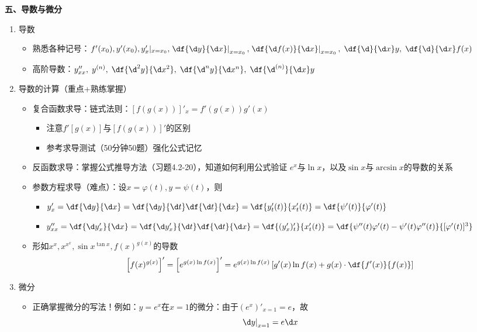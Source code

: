 \bigskip

{\bf 五、导数与微分}
\begin{enumerate}
  \item 导数
  \begin{itemize}
    \item 熟悉各种记号：$f'(x_0), y'(x_0),y'_x|_{x=x_0},
    \left.\df{\d y}{\d x}\right|_{x=x_0},
    \left.\df{\d f(x)}{\d x}\right|_{x=x_0},\;\df{\d}{\d x}y,\;\df{\d}{\d
    x}f(x)$
    \item 高阶导数：$y''_{xx},\;y^{(n)},\;\df{\d^2y}{\d x^2},\;\df{\d^{n}y}{\d
    x^n},\;\df{\d^{(n)}}{\d x}y$
  \end{itemize}
  \item 导数的计算（重点+熟练掌握）
  \begin{itemize}
    \item 复合函数求导：链式法则：$[f(g(x))]'_x=f'(g(x))g'(x)$
    \begin{itemize}
      \item 注意$f'[g(x)]$与$[f(g(x))]'$的区别
      \item 参考求导测试（50分钟50题）强化公式记忆
    \end{itemize}
    \item 反函数求导：掌握公式推导方法（习题4.2-20），知道如何利用公式验证
    $e^x$与$\ln x$，以及$\sin x$与$\arcsin x$的导数的关系
    \item 参数方程求导（难点）：设$x=\varphi(t),y=\psi(t)$，则
    \begin{itemize}
      \item $y'_x=\df{\d y}{\d x}=\df{\d y}{\d t}\df{\d t}{\d x}
      =\df{y'_t(t)}{x'_t(t)}=\df{\psi'(t)}{\varphi'(t)}$
      \item
      $y''_{xx}=\df{\d y'_x}{\d x}=\df{\d y'_x}{\d t}\df{\d t}{\d x}
      =\df{(y'_x)'_t}{x'_t(t)}
      =\df{\psi''(t)\varphi'(t)-\psi'(t)\varphi''(t)}{[\varphi'(t)]^3}$
    \end{itemize}
    \item 形如$x^x,x^{x^x},\sin x^{\tan x},f(x)^{g(x)}$的导数
    $$\left[f(x)^{g(x)}\right]'=\left[e^{g(x)\ln f(x)}\right]'
    =e^{g(x)\ln f(x)}\left[g'(x)\ln f(x)+g(x)\cdot\df{f'(x)}{f(x)}\right]$$
  \end{itemize}
  \item 微分
  \begin{itemize}
    \item 正确掌握微分的写法！例如：$y=e^x$在$x=1$的微分：由于$(e^x)'_{x=1}=e$，故
    $$\left.\d y\right|_{x=1}=e\d x$$

\end{itemize}
\end{enumerate}
